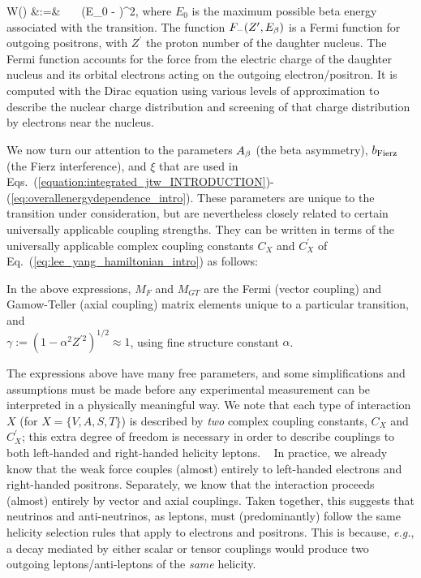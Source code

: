 \bea
W(\Ebeta) &:=&  \, \FFminus \, \xi \, \pe \Ee (E_0 - \Ee)^2,
\label{eq:overallenergydependence_intro}
\eea
where $E_0$ is the maximum possible beta energy associated with the transition.  The function $F_{-}(Z^\prime, E_\beta)$ is a Fermi function for outgoing positrons,
with $Z^\prime$ the proton number of the daughter nucleus.  The Fermi function accounts for the force from the electric charge of the daughter nucleus and its orbital electrons acting on the outgoing electron/positron.  It is computed with the Dirac equation using various levels of approximation to describe the nuclear charge distribution and screening of that charge distribution by electrons near the nucleus.

We now turn our attention to the parameters $A_{\beta}$ (the beta asymmetry), $b_{\mathrm{Fierz}}$ (the Fierz interference), and $\xi$ that are used in Eqs.~(\ref{equation:integrated_jtw_INTRODUCTION})-(\ref{eq:overallenergydependence_intro}).  These parameters are unique to the transition under consideration, but are nevertheless closely related to certain universally applicable coupling strengths.  They can be written in terms of the universally applicable complex coupling constants $C_X$ and $C_X^{\prime}$ of Eq.~(\ref{eq:lee_yang_hamiltonian_intro})
as follows: 


In the above expressions, $M_F$ and $M_{GT}$ are the Fermi (vector coupling) and Gamow-Teller (axial coupling) matrix elements unique to a particular transition,~ and 
\\
\mbox{$\gamma := \left( 1-\alpha^2 Z^{\prime 2} \right)^{1/2} \approx 1$}, using fine structure constant $\alpha$.

The expressions above have many free parameters, and some simplifications and assumptions must be made before any experimental measurement can be interpreted in a physically meaningful way.  
We note that each type of interaction $X$ (for $X=\{V,A,S,T\}$) is described by \emph{two} complex coupling constants, $C_X$ and $C_X^\prime$;  this extra degree of freedom is necessary in order to describe couplings to both left-handed and right-handed helicity leptons.
~
In practice, we already know that the weak force couples (almost) entirely to left-handed electrons and right-handed positrons.  Separately, we know that the interaction proceeds (almost) entirely by vector and axial couplings.  Taken together, this suggests that neutrinos and anti-neutrinos, as leptons, must (predominantly) follow the same helicity selection rules that apply to electrons and positrons.  This is because, \emph{e.g.}, a decay mediated by either scalar or tensor couplings would produce two outgoing leptons/anti-leptons of the \emph{same} helicity.  

